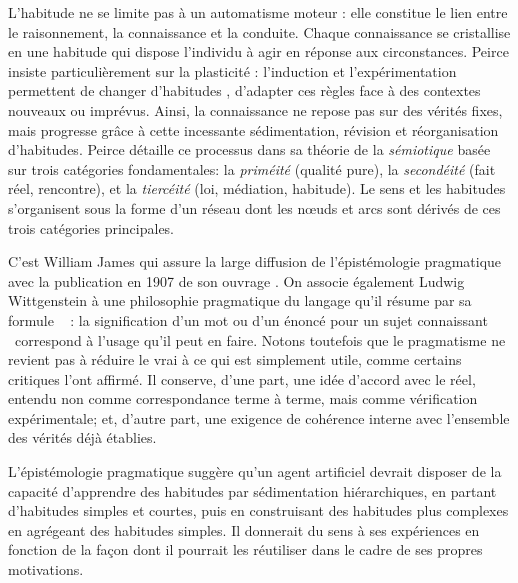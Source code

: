 L'habitude ne se limite pas à un automatisme moteur : elle constitue le lien entre le raisonnement, la connaissance et la conduite.
Chaque connaissance se cristallise en une habitude qui dispose l’individu à agir en réponse aux circonstances. 
Peirce insiste particulièrement sur la plasticité :
l’induction et l’expérimentation permettent de \og changer d’habitudes \fg, d’adapter ces règles face à des contextes nouveaux ou imprévus. 
Ainsi, la connaissance ne repose pas sur des vérités fixes, mais progresse grâce à cette incessante sédimentation, révision et réorganisation d’habitudes.
Peirce détaille ce processus dans sa théorie de la \emph{sémiotique} basée sur trois catégories fondamentales: la \emph{priméité} (qualité pure), la \emph{secondéité} (fait réel, rencontre), et la \emph{tiercéité} (loi, médiation, habitude).
Le sens et les habitudes s'organisent sous la forme d'un réseau dont les n\oe uds et arcs sont dérivés de ces trois catégories principales. 



C'est William James qui assure la large diffusion de l'épistémologie pragmatique avec la publication en 1907 de son ouvrage  \cite{james_pragmatism_2004}.
On associe également Ludwig Wittgenstein à une philosophie pragmatique du langage qu'il résume par sa formule \og {} \fg\  \cite[§43]{wittgenstein_philosophical_1953} : la signification d'un mot ou d'un énoncé pour un \og sujet connaissant \fg\ correspond à l’usage qu'il peut en faire.
Notons toutefois que le pragmatisme ne revient pas à réduire le vrai à ce qui est simplement utile, comme certains critiques l’ont affirmé.
Il conserve, d’une part, une idée d’accord avec le réel, entendu non comme correspondance terme à terme, mais comme vérification expérimentale; et, d’autre part, une exigence de cohérence interne avec l’ensemble des vérités déjà établies.


L'épistémologie pragmatique suggère qu'un agent artificiel devrait disposer de la capacité d'apprendre des habitudes par sédimentation hiérarchiques, en partant d'habitudes simples et courtes, puis en construisant des habitudes plus complexes en agrégeant des habitudes simples. 
Il donnerait du sens à ses expériences en fonction de la façon dont il pourrait les réutiliser dans le cadre de ses propres motivations. 

